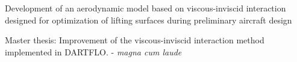 \documentclass[10pt,a4paper,ragged2e,withhyper]{altacv}
\begin{document}
\begin{paracol}{2}
\medskip
Development of an aerodynamic model based on viscous-inviscid interaction designed for optimization of lifting surfaces during preliminary aircraft design

\divider

Master thesis: \textcolor{myRed}{Improvement of the viscous-inviscid interaction method implemented in DARTFLO.} - \textit{magna cum laude}\\








\newpage



\nocite{*}


\end{paracol}
\end{document}
